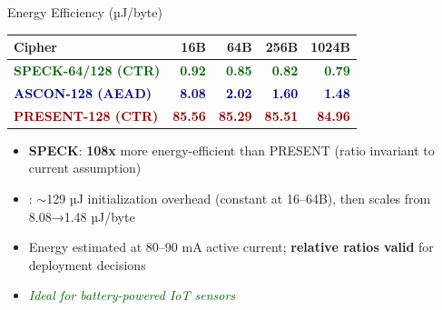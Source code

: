 \documentclass[aspectratio=169]{beamer}
\begin{document}
\begin{frame}{Energy Efficiency (µJ/byte)}
\begin{table}
    \centering
    \small
    \begin{tabular}{lrrrr}
        \toprule
        \textbf{Cipher} & \textbf{16B} & \textbf{64B} & \textbf{256B} & \textbf{1024B} \\
        \midrule
        \textcolor{darkgreen}{\textbf{SPECK-64/128 (CTR)}} & \textcolor{darkgreen}{\textbf{0.92}} & \textcolor{darkgreen}{\textbf{0.85}} & \textcolor{darkgreen}{\textbf{0.82}} & \textcolor{darkgreen}{\textbf{0.79}} \\
        \textcolor{darkblue}{\textbf{ASCON-128 (AEAD)}} & \textcolor{darkblue}{\textbf{8.08}} & \textcolor{darkblue}{\textbf{2.02}} & \textcolor{darkblue}{\textbf{1.60}} & \textcolor{darkblue}{\textbf{1.48}} \\
        \textcolor{darkred}{\textbf{PRESENT-128 (CTR)}} & \textcolor{darkred}{\textbf{85.56}} & \textcolor{darkred}{\textbf{85.29}} & \textcolor{darkred}{\textbf{85.51}} & \textcolor{darkred}{\textbf{84.96}} \\
        \bottomrule
    \end{tabular}
\end{table}
\vspace{-0.15cm}
\begin{itemize}
    \item \alert{\textbf{SPECK}}: \textbf{108x} more energy-efficient than PRESENT (ratio invariant to current assumption)
    \item {}: $\sim$129 µJ initialization overhead (constant at 16–64B), then scales from 8.08→1.48 µJ/byte
    \item Energy estimated at 80–90 mA active current; \textbf{relative ratios valid} for deployment decisions
    \item \textcolor{darkgreen}{\textit{Ideal for battery-powered IoT sensors}}
\end{itemize}
\end{frame}
\end{document}
